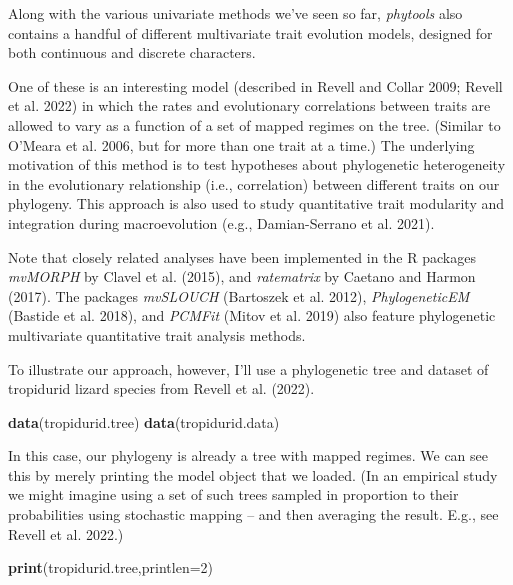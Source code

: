 \documentclass[fleqn,10pt,lineno]{wlpeerj} %
\newenvironment{Shaded}{\begin{snugshade}}{\end{snugshade}}
\newcommand{\AttributeTok}[1]{\textcolor[rgb]{0.13,0.29,0.53}{#1}}
\newcommand{\DecValTok}[1]{\textcolor[rgb]{0.00,0.00,0.81}{#1}}
\newcommand{\FunctionTok}[1]{\textcolor[rgb]{0.13,0.29,0.53}{\textbf{#1}}}
\newcommand{\NormalTok}[1]{#1}
\begin{document}
Along with the various univariate methods we've seen so far, \emph{phytools} also contains a handful of different multivariate trait evolution models, designed for both continuous and discrete characters.

One of these is an interesting model (described in Revell and Collar 2009; Revell et al. 2022) in which the rates and evolutionary correlations between traits are allowed to vary as a function of a set of mapped regimes on the tree. (Similar to O'Meara et al. 2006, but for more than one trait at a time.) The underlying motivation of this method is to test hypotheses about phylogenetic heterogeneity in the evolutionary relationship (i.e., correlation) between different traits on our phylogeny. This approach is also used to study quantitative trait modularity and integration during macroevolution (e.g., Damian-Serrano et al. 2021).

Note that closely related analyses have been implemented in the R packages \emph{mvMORPH} by Clavel et al. (2015), and \emph{ratematrix} by Caetano and Harmon (2017). The packages \emph{mvSLOUCH} (Bartoszek et al. 2012), \emph{PhylogeneticEM} (Bastide et al. 2018), and \emph{PCMFit} (Mitov et al. 2019) also feature phylogenetic multivariate quantitative trait analysis methods.

To illustrate our approach, however, I'll use a phylogenetic tree and dataset of tropidurid lizard species from Revell et al. (2022).

\begin{Shaded}
\begin{Highlighting}[]
\FunctionTok{data}\NormalTok{(tropidurid.tree)}
\FunctionTok{data}\NormalTok{(tropidurid.data)}
\end{Highlighting}
\end{Shaded}

In this case, our phylogeny is already a tree with mapped regimes. We can see this by merely printing the model object that we loaded. (In an empirical study we might imagine using a set of such trees sampled in proportion to their probabilities using stochastic mapping -- and then averaging the result. E.g., see Revell et al. 2022.)

\begin{Shaded}
\begin{Highlighting}[]
\FunctionTok{print}\NormalTok{(tropidurid.tree,}\AttributeTok{printlen=}\DecValTok{2}\NormalTok{)}
\end{Highlighting}
\end{Shaded}
\end{document}
